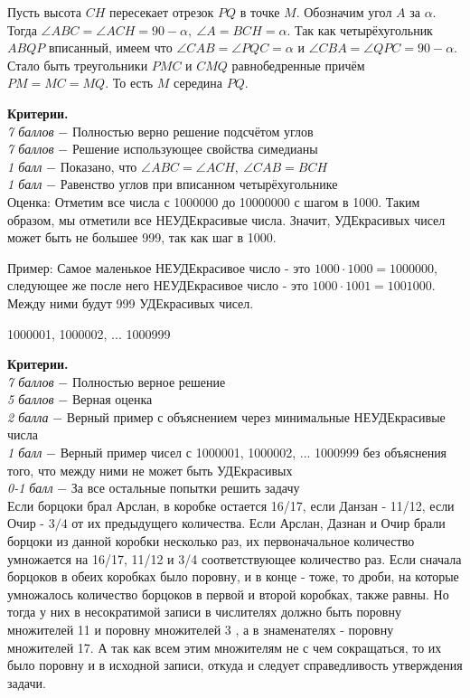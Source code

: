 Пусть высота $CH$ пересекает отрезок $PQ$ в точке $M$. Обозначим угол $A$ за $\alpha$. Тогда $\angle ABC = \angle ACH =  90 - \alpha , \ \angle A = BCH = \alpha $. Так как четырёхугольник $ABQP$ вписанный, имеем что $\angle CAB = \angle PQC = \alpha$  и $\angle CBA = \angle QPC = 90 - \alpha$. Стало быть треугольники $PMC$ и $CMQ$ равнобедренные причём $PM = MC = MQ$. То есть $M$ середина $PQ$.

\textbf{Критерии.} \\
\textit{7 баллов} $-$ Полностью верно решение подсчётом углов\\
\textit{7 баллов} $-$ Решение использующее свойства симедианы\\
\textit{1 балл} $-$  Показано, что $\angle ABC = \angle ACH , \ \angle CAB = BCH$ \\ 
\textit{1 балл} $-$ Равенство углов при вписанном четырёхугольнике\\


 Оценка: Отметим все числа с 1000000 до 10000000 с шагом в 1000. Таким образом, мы отметили все НЕУДЕкрасивые числа. Значит, УДЕкрасивых чисел может быть не большее 999, так как шаг в 1000.

Пример: Самое маленькое НЕУДЕкрасивое число - это $1000\cdot1000=1000000$, следующее же после него НЕУДЕкрасивое число - это $1000\cdot1001=1001000$. Между ними будут 999 УДЕкрасивых чисел.

1000001, 1000002, ... 1000999\par

\textbf{Критерии.} \\
\textit{7 баллов} $-$ Полностью верное решение\\
\textit{5 баллов} $-$ Верная оценка\\
\textit{2 балла} $-$ Верный пример с объяснением через минимальные НЕУДЕкрасивые числа\\
\textit{1 балл} $-$  Верный пример чисел с 1000001, 1000002, ... 1000999 без объяснения того, что между ними не может быть УДЕкрасивых\\ 
\textit{0-1 балл} $-$ За все остальные попытки решить задачу\\


Если борцоки брал Арслан, в коробке остается 16/17, если Данзан - 11/12, если Очир - $3 / 4$ от их предыдущего количества. Если Арслан, Дазнан и Очир брали борцоки из данной коробки несколько раз, их первоначальное количество умножается на 16/17, 11/12 и 3/4 соответствующее количество раз. Если сначала борцоков в обеих коробках было поровну, и в конце - тоже, то дроби, на которые умножалось количество борцоков в первой и второй коробках, также равны. Но тогда у них в несократимой записи в числителях должно быть поровну множителей 11 и поровну множителей 3 , а в знаменателях - поровну множителей 17. А так как всем этим множителям не с чем сокращаться, то их было поровну и в исходной записи, откуда и следует справедливость утверждения задачи.

